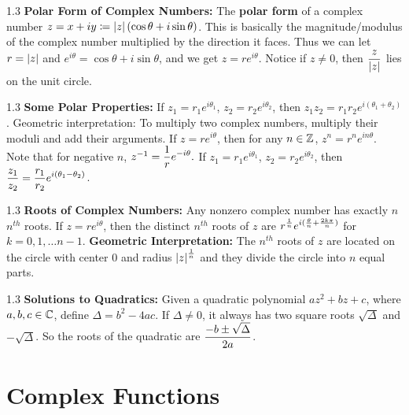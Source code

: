 \documentclass{article}
\newcommand{\framethis}[2][1.3]{
  \begin{framed}
    \begin{spacing}{#1}
      #2
    \end{spacing}
  \end{framed}
}
\begin{document}
  \framethis{\textbf{Polar Form of Complex Numbers:}\el
  The \textbf{polar form} of a complex number $z = x+iy \coloneqq \left|z\right| (\cos\theta + i \sin\theta)$.
  This is basically the magnitude/modulus of the complex number multiplied by the direction it faces.
  Thus we can let $r = \left|z\right|$ and $e^{i\theta} = \cos\theta + i\sin\theta$, and we get
  $z = re^{i\theta}$. Notice if $z \neq 0$, then $\displaystyle \frac{z}{\left|z\right|}$ lies on the unit circle.
  }


  \framethis{\textbf{Some Polar Properties:}\el
    If $z_1 = r_1e^{i\theta_1}$, $z_2 = r_2e^{i\theta_2}$, then $z_1z_2=r_1r_2e^{i(\theta_1+\theta_2)}$.
    Geometric interpretation: To multiply two complex numbers, multiply their moduli and add their arguments.\el
    If $z = re^{i\theta}$, then for any $n \in {\mathbb Z}$, $z^n=r^n e^{in\theta}$. Note that for negative $n$, $z^{-1} = 
    \displaystyle \frac{1}{r}e^{-i\theta}.$\el
    If $z_1 = r_1e^{i\theta_1}$, $z_2 = r_2e^{i\theta_2}$, then $\displaystyle\frac{z_1}{z_2}
    = \frac{r_1}{r_2}e^{i(\theta_1 - \theta_2)}$.   
  }


  \framethis{\textbf{Roots of Complex Numbers:} Any nonzero complex number has exactly
  $n$ $n^{th}$ roots.\el
  If $z = re^{i\theta}$, then the distinct $n^{th}$ roots of $z$ are 
  $\displaystyle r^{\frac{1}{n}}e^{i(\frac{\theta}{n} + \frac{2k\pi}{n})}$ for 
  $k = 0,1, \ldots n-1$.\el
  \textbf{Geometric Interpretation:} The $n^{th}$ roots of $z$ are located on the
  circle with center 0 and radius $\left|z\right|^{\frac{1}{n}}$ and they divide the circle
  into $n$ equal parts.}

  \framethis{\textbf{Solutions to Quadratics:} Given a quadratic polynomial 
  $az^2+bz+c$, where $a,b,c \in {\mathbb C}$, define $\Delta = b^2-4ac$. If $\Delta \neq 0$,
  it always has two square roots $\sqrt{\Delta}$ and $-\sqrt{\Delta}$. So the roots
  of the quadratic are $\displaystyle \frac{-b\pm \sqrt{\Delta}}{2a}$.}

  \section{Complex Functions} \vspace{7mm} 
\end{document}
